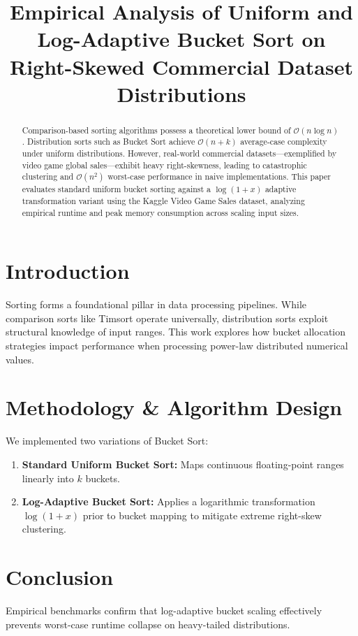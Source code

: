 \documentclass[conference]{IEEEtran}
\begin{document}
\title{Empirical Analysis of Uniform and Log-Adaptive Bucket Sort on Right-Skewed Commercial Dataset Distributions}

\author{
}

\maketitle

\begin{abstract}
Comparison-based sorting algorithms possess a theoretical lower bound of $\mathcal{O}(n \log n)$. Distribution sorts such as Bucket Sort achieve $\mathcal{O}(n + k)$ average-case complexity under uniform distributions. However, real-world commercial datasets—exemplified by video game global sales—exhibit heavy right-skewness, leading to catastrophic clustering and $\mathcal{O}(n^2)$ worst-case performance in naive implementations. This paper evaluates standard uniform bucket sorting against a $\log(1+x)$ adaptive transformation variant using the Kaggle Video Game Sales dataset, analyzing empirical runtime and peak memory consumption across scaling input sizes.
\end{abstract}

\section{Introduction}
Sorting forms a foundational pillar in data processing pipelines. While comparison sorts like Timsort operate universally, distribution sorts exploit structural knowledge of input ranges. This work explores how bucket allocation strategies impact performance when processing power-law distributed numerical values.

\section{Methodology \& Algorithm Design}
We implemented two variations of Bucket Sort:
\begin{enumerate}
    \item \textbf{Standard Uniform Bucket Sort:} Maps continuous floating-point ranges linearly into $k$ buckets.
    \item \textbf{Log-Adaptive Bucket Sort:} Applies a logarithmic transformation $\log(1+x)$ prior to bucket mapping to mitigate extreme right-skew clustering.
\end{enumerate}

\section{Conclusion}
Empirical benchmarks confirm that log-adaptive bucket scaling effectively prevents worst-case runtime collapse on heavy-tailed distributions.
\end{document}
